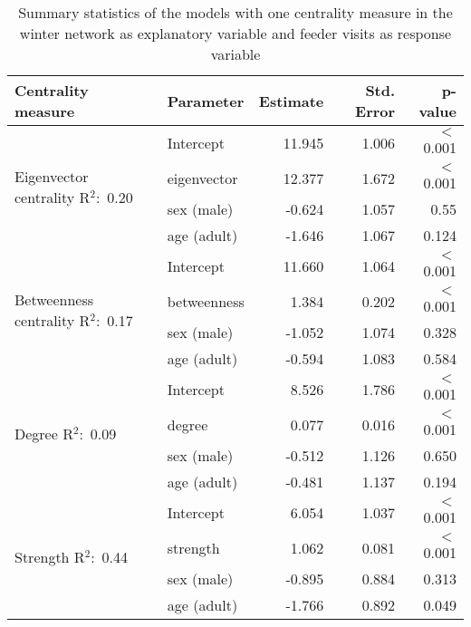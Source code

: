 \documentclass[10pt, twoside]{book} %
\begin{document}
\clearpage
\begin{table}[h!]
	\begin{center}
		\begin{footnotesize}
			\caption{Summary statistics of the models with one centrality measure in the winter network as explanatory variable and feeder visits as response variable} \label{tab4-3} 
			
			\begingroup
			\setlength{\tabcolsep}{8pt} %
			\renewcommand{\arraystretch}{1.5} %
			\begin{tabular}{p{2cm} l r r r }
				
				\toprule
				\textbf{Centrality measure} & \textbf{Parameter} & \textbf{Estimate} & \textbf{Std. Error} &\textbf{p-value}\\
				\hline
				\multirow{4}{2cm}{Eigenvector centrality \mbox{R$^2$: 0.20}} & Intercept & 11.945 & 1.006 & $<$ 0.001\\
				& eigenvector & 12.377 & 1.672 & $<$ 0.001\\
				& sex (male) & -0.624 & 1.057 & 0.55\\
				& age (adult) & -1.646 & 1.067 & 0.124\\
				\hline
				\multirow{4}{2cm}{Betweenness centrality \mbox{R$^2$: 0.17}} & Intercept & 11.660 & 1.064 & $<$ 0.001\\
				& betweenness & 1.384 & 0.202 & $<$ 0.001\\
				& sex (male) & -1.052 & 1.074 & 0.328\\
				& age (adult) & -0.594 & 1.083 & 0.584\\
				\hline
				\multirow{4}{2cm}{Degree \mbox{R$^2$: 0.09}} & Intercept & 8.526 & 1.786 & $<$ 0.001\\
				& degree & 0.077 & 0.016 & $<$ 0.001\\
				& sex (male) & -0.512 & 1.126 & 0.650\\
				& age (adult) & -0.481 & 1.137 & 0.194\\
				\hline
				\multirow{4}{2cm}{Strength \mbox{R$^2$: 0.44}} & Intercept & 6.054 & 1.037 & $<$ 0.001\\
				& strength & 1.062 & 0.081 & $<$ 0.001\\
				& sex (male) & -0.895 & 0.884 & 0.313\\
				& age (adult) & -1.766 & 0.892 & 0.049\\
				\bottomrule
			\end{tabular}\endgroup
		\end{footnotesize}
	\end{center}
\end{table}
\end{document}
